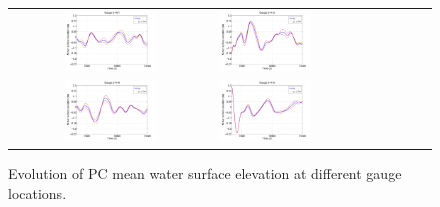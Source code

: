 \begin{figure}[ht]
\begin{tabular}{clc}
        
\includegraphics[width=0.475\textwidth]{./figures/musigma1.pdf} &
\includegraphics[width=0.475\textwidth]{./figures/musigma2.pdf} \\
\includegraphics[width=0.475\textwidth]{./figures/musigma3.pdf} &
\includegraphics[width=0.475\textwidth]{./figures/musigma4.pdf}
\end{tabular}
\caption{Evolution of PC mean water surface elevation at different gauge locations.}
\label{fig:ave}
\end{figure}
